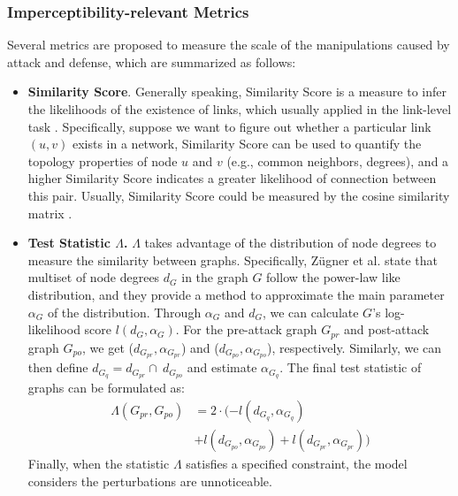 \subsubsection{Imperceptibility-relevant Metrics}
Several metrics are proposed to measure the scale of the manipulations caused by attack and defense, which are summarized as follows:
\begin{itemize}
	\item \textbf{Similarity Score}. Generally speaking, Similarity Score is a measure to infer the likelihoods of the existence of links, which usually applied in the link-level task \cite{lu2011link,zhou2019attacking}. Specifically, suppose we want to figure out whether a particular link $(u,v)$ exists in a network, Similarity Score can be used to quantify the topology properties of node $u$ and $v$ (e.g., common neighbors, degrees), and a higher Similarity Score indicates a greater likelihood of connection between this pair. Usually, Similarity Score could be measured by the cosine similarity matrix \cite{sun2018data}.

	\item \textbf{Test Statistic $\Lambda$.} $\Lambda$ takes advantage of the distribution of node degrees to measure the similarity between graphs. Specifically,  Z\"ugner et al. \cite{zugner2018adversarial} state that multiset of node degrees $\mathit{d}_{G}$ in the graph $G$ follow the power-law like distribution, and they provide a method to approximate the main parameter $\alpha_{G}$ of the distribution. Through $\alpha_{G}$ and $\mathit{d}_{G}$, we can calculate $G$'s log-likelihood score $l(\mathit{d}_{G}, \alpha_{G})$. For the pre-attack graph $G_{pr}$ and post-attack graph $G_{po}$, we get ($\mathit{d}_{G_{pr}},\alpha_{G_{pr}}$) and ($\mathit{d}_{G_{po}}, \alpha_{G_{po}}$), respectively. Similarly, we can then define $\mathit{d}_{G_{q}} = \mathit{d}_{G_{pr}}  \cap \  \mathit{d}_{G_{po}}$ and estimate $\alpha_{G_{q}}$. The final test statistic of graphs can be formulated as:
	      \begin{equation}
		      \begin{aligned}
			      \Lambda(G_{pr}, G_{po}) & = 2 \cdot (-l(\mathit{d}_{G_{q}}, \alpha_{G_{q}}) \\
			                              & + l(\mathit{d}_{G_{po}}, \alpha_{G_{po}})
			      + l(\mathit{d}_{G_{pr}}, \alpha_{G_{pr}}))
		      \end{aligned}
	      \end{equation}
	      Finally, when the statistic $\Lambda$ satisfies a specified constraint, the model considers the perturbations are unnoticeable.


\end{itemize}

